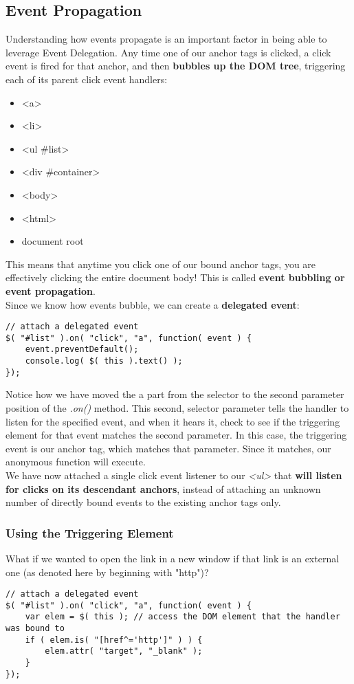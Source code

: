 \documentclass[10pt,letterpaper]{report}
\begin{document}
\subsection{Event Propagation}
Understanding how events propagate is an important factor in being able to leverage Event Delegation. Any time one of our anchor tags is clicked, a click event is fired for that anchor, and then \textbf{bubbles up the DOM tree}, triggering each of its parent click event handlers:
\begin{itemize}
\item <a>
\item <li>
\item <ul \#list>
\item <div \#container>
\item <body>
\item <html>
\item document root
\end{itemize}

This means that anytime you click one of our bound anchor tags, you are effectively clicking the entire document body! This is called \textbf{event bubbling or event propagation}.\\
Since we know how events bubble, we can create a \textbf{delegated event}: 
\begin{lstlisting}
// attach a delegated event
$( "#list" ).on( "click", "a", function( event ) {
	event.preventDefault();
	console.log( $( this ).text() );
});
\end{lstlisting}
Notice how we have moved the a part from the selector to the second parameter position of the \textit{.on()} method. This second, selector parameter tells the handler to listen for the specified event, and when it hears it, check to see if the triggering element for that event matches the second parameter. In this case, the triggering event is our anchor tag, which matches that parameter. Since it matches, our anonymous function will execute.\\ We have now attached a single click event listener to our \textit{<ul>} that \textbf{will listen for clicks on its descendant anchors}, instead of attaching an unknown number of directly bound events to the existing anchor tags only.
\subsubsection{Using the Triggering Element}
What if we wanted to open the link in a new window if that link is an external one (as denoted here by beginning with "http")?
\begin{lstlisting}
// attach a delegated event
$( "#list" ).on( "click", "a", function( event ) {
	var elem = $( this ); // access the DOM element that the handler was bound to
	if ( elem.is( "[href^='http']" ) ) {
		elem.attr( "target", "_blank" );
	}
});
\end{lstlisting}
\end{document}
